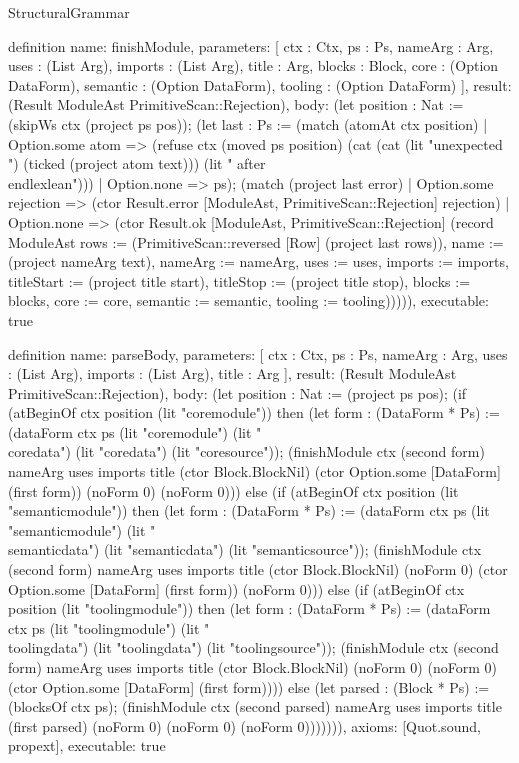 \begin{lexlean}{StructuralGrammar}
\begin{semanticmodule}
{{definition{
  name: finishModule,
  parameters: [
    ctx : Ctx,
    ps : Ps,
    nameArg : Arg,
    uses : (List Arg),
    imports : (List Arg),
    title : Arg,
    blocks : Block,
    core : (Option DataForm),
    semantic : (Option DataForm),
    tooling : (Option DataForm)
  ],
  result: (Result ModuleAst PrimitiveScan::Rejection),
  body: (let position : Nat := (skipWs ctx (project ps pos)); (let last : Ps := (match (atomAt ctx position)
    | Option.some atom => (refuse ctx (moved ps position) (cat (cat (lit "unexpected ") (ticked (project atom text))) (lit " after \\end{lexlean}")))
    | Option.none => ps); (match (project last error)
    | Option.some rejection => (ctor Result.error [ModuleAst, PrimitiveScan::Rejection] rejection)
    | Option.none => (ctor Result.ok [ModuleAst, PrimitiveScan::Rejection] (record ModuleAst {rows := (PrimitiveScan::reversed [Row] (project last rows)), name := (project nameArg text), nameArg := nameArg, uses := uses, imports := imports, titleStart := (project title start), titleStop := (project title stop), blocks := blocks, core := core, semantic := semantic, tooling := tooling}))))),
  executable: true
}

definition{
  name: parseBody,
  parameters: [
    ctx : Ctx,
    ps : Ps,
    nameArg : Arg,
    uses : (List Arg),
    imports : (List Arg),
    title : Arg
  ],
  result: (Result ModuleAst PrimitiveScan::Rejection),
  body: (let position : Nat := (project ps pos); (if (atBeginOf ctx position (lit "coremodule")) then (let form : (DataForm * Ps) := (dataForm ctx ps (lit "coremodule") (lit "\\coredata") (lit "coredata") (lit "coresource")); (finishModule ctx (second form) nameArg uses imports title (ctor Block.BlockNil) (ctor Option.some [DataForm] (first form)) (noForm 0) (noForm 0))) else (if (atBeginOf ctx position (lit "semanticmodule")) then (let form : (DataForm * Ps) := (dataForm ctx ps (lit "semanticmodule") (lit "\\semanticdata") (lit "semanticdata") (lit "semanticsource")); (finishModule ctx (second form) nameArg uses imports title (ctor Block.BlockNil) (noForm 0) (ctor Option.some [DataForm] (first form)) (noForm 0))) else (if (atBeginOf ctx position (lit "toolingmodule")) then (let form : (DataForm * Ps) := (dataForm ctx ps (lit "toolingmodule") (lit "\\toolingdata") (lit "toolingdata") (lit "toolingsource")); (finishModule ctx (second form) nameArg uses imports title (ctor Block.BlockNil) (noForm 0) (noForm 0) (ctor Option.some [DataForm] (first form)))) else (let parsed : (Block * Ps) := (blocksOf ctx ps); (finishModule ctx (second parsed) nameArg uses imports title (first parsed) (noForm 0) (noForm 0) (noForm 0))))))),
  axioms: [Quot.sound, propext],
  executable: true
}

}}
\end{semanticmodule}
\end{lexlean}
